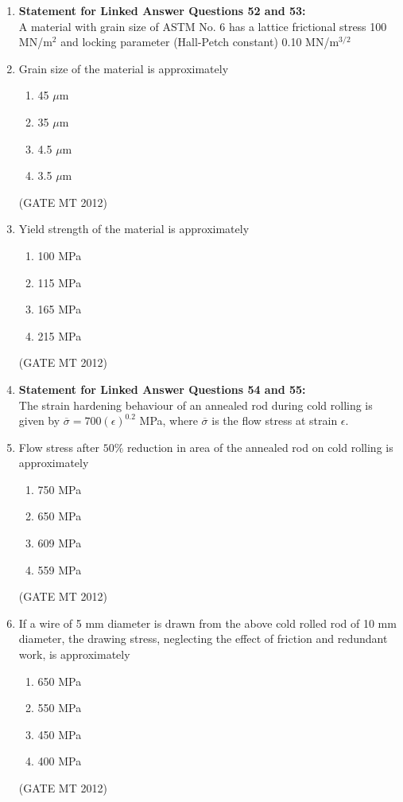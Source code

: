 \documentclass[journal, 11pt, onecolumn]{IEEEtran}
\theoremstyle{remark}
\begin{document}
\begin{enumerate}
\item[] \textbf{Statement for Linked Answer Questions 52 and 53:} \\
A material with grain size of ASTM No. 6 has a lattice frictional stress 100 MN/m$^2$ and locking parameter (Hall-Petch constant) 0.10 MN/m$^{3/2}$

\item Grain size of the material is approximately
\begin{multicols}{2}
\begin{enumerate}  
\item 45 $\mu$m
\item 35 $\mu$m
\item 4.5 $\mu$m
\item 3.5 $\mu$m
\end{enumerate}
\end{multicols}
\hfill(GATE MT 2012)

\item Yield strength of the material is approximately
\begin{multicols}{2}
\begin{enumerate}  
\item 100 MPa
\item 115 MPa
\item 165 MPa
\item 215 MPa
\end{enumerate}
\end{multicols}
\hfill(GATE MT 2012)

\item[] \textbf{Statement for Linked Answer Questions 54 and 55:}\\
The strain hardening behaviour of an annealed rod during cold rolling is given by $\overline{\sigma} = 700(\epsilon)^{0.2}$ MPa, where $\overline{\sigma}$ is the flow stress at strain $\epsilon$.

\item Flow stress after $50\%$ reduction in area of the annealed rod on cold rolling is approximately
\begin{multicols}{2}
\begin{enumerate}  
\item 750 MPa
\item 650 MPa
\item 609 MPa
\item 559 MPa
\end{enumerate}
\end{multicols}
\hfill(GATE MT 2012)

\item If a wire of 5 mm diameter is drawn from the above cold rolled rod of 10 mm diameter, the drawing stress, neglecting the effect of friction and redundant work, is approximately
\begin{multicols}{2}
\begin{enumerate}  
\item 650 MPa
\item 550 MPa
\item 450 MPa
\item 400 MPa
\end{enumerate}
\end{multicols}
\hfill(GATE MT 2012)


\end{enumerate}
\end{document}
